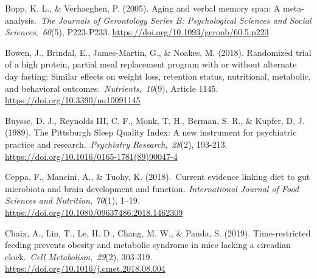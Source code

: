 \documentclass[authordate, empirical,issue]{jote-new-article}
\begin{document}



Bopp, K. L., \& Verhaeghen, P. (2005). Aging and verbal memory span: A meta-analysis. \emph{The Journals of Gerontology Series B: Psychological Sciences and Social Sciences}, \emph{60}(5), P223-P233. \url{https://doi.org/10.1093/geronb/60.5.p223}



Bowen, J., Brindal, E., James-Martin, G., \& Noakes, M. (2018). Randomized trial of a high protein, partial meal replacement program with or without alternate day fasting: Similar effects on weight loss, retention status, nutritional, metabolic, and behavioral outcomes. \emph{Nutrients}, \emph{10}(9), Article 1145. \url{https://doi.org/10.3390/nu10091145}






Buysse, D. J., Reynolds III, C. F., Monk, T. H., Berman, S. R., \& Kupfer, D. J. (1989). The Pittsburgh Sleep Quality Index: A new instrument for psychiatric practice and research. \emph{Psychiatry Research}, \emph{28}(2), 193-213. \url{https://doi.org/10.1016/0165-1781(89)90047-4}



Ceppa, F., Mancini, A., \& Tuohy, K. (2018). Current evidence linking diet to gut microbiota and brain development and function\emph{. International Journal of Food Sciences and Nutrition, 70}(1), 1--19\emph{.} \url{https://doi.org/10.1080/09637486.2018.1462309}



Chaix, A., Lin, T., Le, H. D., Chang, M. W., \& Panda, S. (2019). Time-restricted feeding prevents obesity and metabolic syndrome in mice lacking a circadian clock. \emph{Cell Metabolism}, \emph{29}(2), 303-319. \url{https://doi.org/10.1016/j.cmet.2018.08.004}



\end{document}
